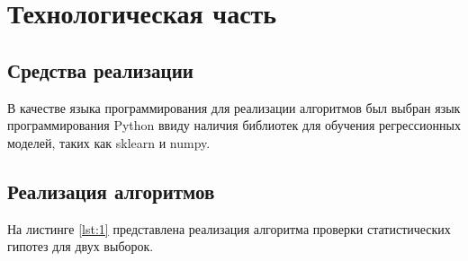 \chapter{Технологическая часть}

\section{Средства реализации}

В качестве языка программирования для реализации алгоритмов был выбран язык программирования Python ввиду наличия библиотек для обучения регрессионных моделей, таких как sklearn и numpy.

\section{Реализация алгоритмов}

На листинге \ref{lst:1} представлена реализация алгоритма проверки статистических гипотез для двух выборок.

